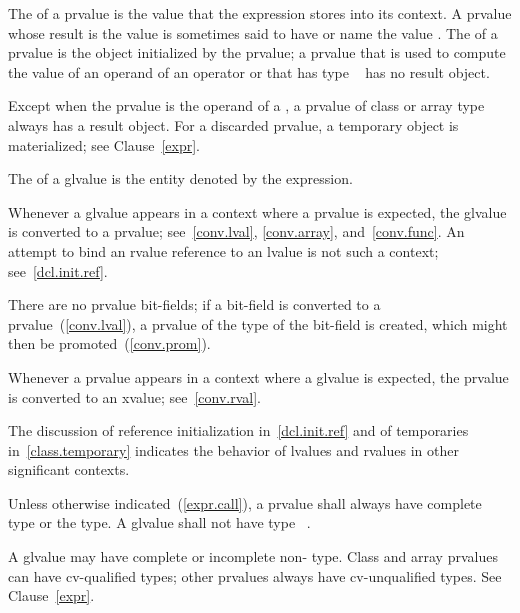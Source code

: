 \pnum
The  of a prvalue
is the value that the expression stores into its context.
A prvalue whose result is the value 
is sometimes said to have or name the value .
The  of a prvalue
is the object initialized by the prvalue;
a prvalue
that is used to compute the value of an operand of an operator or
that has type \cv{}~
has no result object.
\begin{note}
Except when the prvalue is the operand of a ,
a prvalue of class or array type always has a result object.
For a discarded prvalue, a temporary object is materialized; see Clause~\ref{expr}.
\end{note}
The  of a glvalue is the entity denoted by the expression.

\pnum
\begin{note}
Whenever a glvalue appears in a context where a prvalue is expected, the glvalue is converted
to a prvalue; see~\ref{conv.lval}, \ref{conv.array},
and~\ref{conv.func}.
An attempt to bind an rvalue reference to an lvalue is not such a context; see~\ref{dcl.init.ref}.
\end{note}
\begin{note}
There are no prvalue bit-fields; if a bit-field is converted to a
prvalue~(\ref{conv.lval}), a prvalue of the type of the bit-field is
created, which might then be promoted~(\ref{conv.prom}).
\end{note}

\pnum
\begin{note}
Whenever a prvalue appears in a context where a glvalue is expected,
the prvalue is converted to an xvalue; see~\ref{conv.rval}.
\end{note}

\pnum
The discussion of reference initialization in~\ref{dcl.init.ref} and of
temporaries in~\ref{class.temporary} indicates the behavior of lvalues
and rvalues in other significant contexts.

\pnum
Unless otherwise indicated~(\ref{expr.call}),
a prvalue shall always have complete type or the  type.
A glvalue shall not have type \cv{}~.
\begin{note}
A glvalue may have complete or incomplete non- type.
Class and array prvalues can have cv-qualified types; other prvalues
always have cv-unqualified types. See Clause~\ref{expr}.
\end{note}


